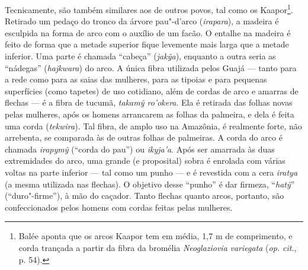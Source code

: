Tecnicamente, são também similares aos de outros povos, tal como os
Kaapor\footnote{Balée aponta que os arcos Kaapor tem em média, 1,7 m de
  comprimento, e corda trançada a partir da fibra da bromélia
  \emph{Neoglaziovia} \emph{variegata} (\emph{op. cit}., p. 54).}. Retirado um
pedaço do tronco da árvore pau"-d'arco (\emph{irapara}), a madeira é
esculpida na forma de arco com o auxílio de um facão. O entalhe na
madeira é feito de forma que a metade superior fique levemente mais
larga que a metade inferior. Uma parte é chamada ``cabeça''
(\emph{jakỹa}), enquanto a outra seria as ``nádegas'' (\emph{hajkwara}) do
arco. A única fibra utilizada pelos Guajá --- tanto para a rede como para
as saias das mulheres, para as tipoias e para pequenas superfícies (como
tapetes) de uso cotidiano, além de cordas de arco e amarras de flechas ---
é a fibra de tucumã, \emph{takamỹ ro'okera}. Ela é retirada das folhas
novas pelas mulheres, após os homens arrancarem as folhas da palmeira, e
dela é feita uma corda (\emph{tekwira}). Tal fibra, de amplo uso na
Amazônia, é realmente forte, não arrebenta, se comparada às de outras
folhas de palmeiras. A corda do arco é chamada \emph{irapymỹ} (``corda do
pau'') ou \emph{ikyja'a}. Após ser amarrada às duas extremidades do arco,
uma grande (e proposital) sobra é enrolada com várias voltas na parte
inferior --- tal como um punho --- e é revestida com a cera \emph{iratya} (a
mesma utilizada nas flechas). O objetivo desse ``punho'' é dar firmeza,
``\emph{hatỹ}'' (``duro"-firme''), à mão do caçador. Tanto flechas quanto
arcos, portanto, são confeccionados pelos homens com cordas feitas pelas
mulheres.

